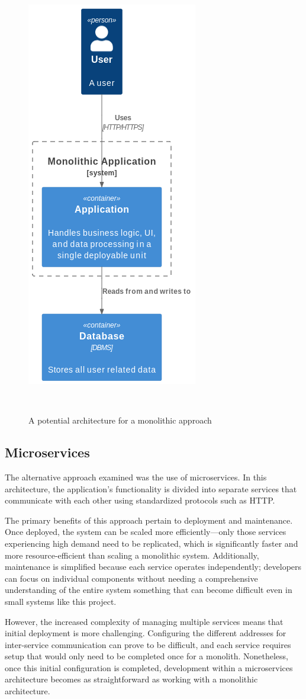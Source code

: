 \begin{figure} [H]
    \centering
    \includegraphics[width=0.35\linewidth]{figures/monolithic_arch.png}
    \caption{A potential architecture for a monolithic approach}
~\label{fig:monolith-arch}
\end{figure}

\subsection{Microservices}
The alternative approach examined was the use of microservices. In this architecture, the application's functionality is divided into separate services that communicate with each other using standardized protocols such as HTTP.\@

The primary benefits of this approach pertain to deployment and maintenance. Once deployed, the system can be scaled more efficiently—only those services experiencing high demand need to be replicated, which is significantly faster and more resource-efficient than scaling a monolithic system. Additionally, maintenance is simplified because each service operates independently; developers can focus on individual components without needing a comprehensive understanding of the entire system something that can become difficult even in small systems like this project.

However, the increased complexity of managing multiple services means that initial deployment is more challenging. Configuring the different addresses for inter-service communication can prove to be difficult, and each service requires setup that would only need to be completed once for a monolith. Nonetheless, once this initial configuration is completed, development within a microservices architecture becomes as straightforward as working with a monolithic architecture.

